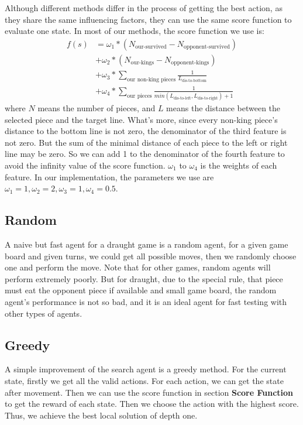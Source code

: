 Although different methods differ in the process of getting the best action, as they share the same influencing factors, they can use the same score function to evaluate one state. In most of our methods, the score function we use is:\\
\begin{equation}
\begin{aligned}
f(s) &= \omega_1*(N_{\text{our-survived}}-N_{\text{opponent-survived}})
\\ &+\omega_2*(N_{\text{our-kings}}-N_{\text{opponent-kings}})
\\ &+\omega_3*\sum\limits_{\text{our non-king pieces}}\frac{1}{L_{\text{dis-to-bottom}}}
\\ &+\omega_4*\sum\limits_{\text{our pieces}}\frac{1}{min(L_{\text{dis-to-left}}, L_{\text{dis-to-right}})+1}
\end{aligned}
\end{equation}
where $N$ means the number of pieces, and $L$ means the distance between the selected piece and the target line. What's more, since every non-king piece's distance to the bottom line is not zero, the denominator of the third feature is not zero. But the sum of the minimal distance of each piece to the left or right line may be zero. So we can add 1 to the denominator of the fourth feature to avoid the infinity value of the score function. $\omega_1$ to $\omega_4$ is the weights of each feature. In our implementation, the parameters we use are $\omega_1=1,\omega_2=2,\omega_3=1,\omega_4=0.5$.

\subsection{Random}
A naive but fast agent for a draught game is a random agent, for a given game board and given turns, we could get all possible moves, then we randomly choose one and perform the move. Note that for other games, random agents will perform extremely poorly. But for draught, due to the special rule, that piece must eat the opponent piece if available and small game board, the random agent's performance is not so bad, and it is an ideal agent for fast testing with other types of agents. 

\subsection{Greedy}
A simple improvement of the search agent is a greedy method. For the current state, firstly we get all the valid actions. For each action, we can get the state after movement. Then we can use the score function in section \textbf{Score Function} to get the reward of each state. Then we choose the action with the highest score. Thus, we achieve the best local solution of depth one.

